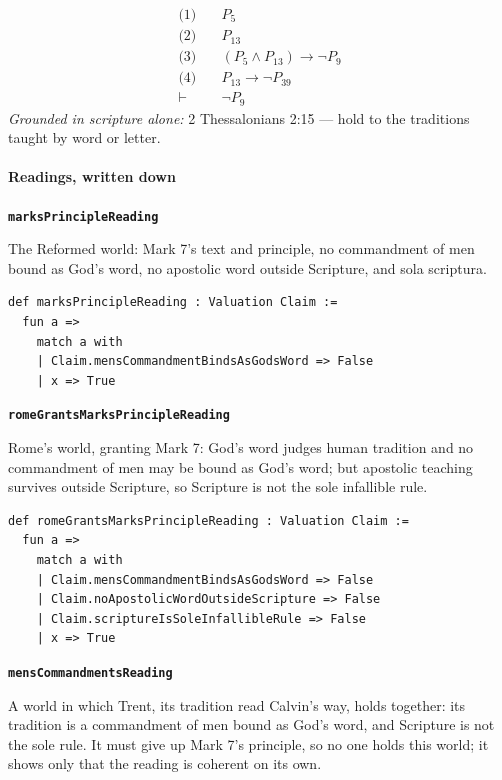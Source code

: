 \documentclass[11pt]{article}
\begin{document}
\begin{align*}
  \text{(1)} \quad & P_{5} \\
  \text{(2)} \quad & P_{13} \\
  \text{(3)} \quad & (P_{5} \land P_{13}) \rightarrow \lnot P_{9} \\
  \text{(4)} \quad & P_{13} \rightarrow \lnot P_{39} \\
  \vdash \quad & \lnot P_{9}
\end{align*}
\emph{Grounded in scripture alone:} 2 Thessalonians 2:15 — hold to the traditions taught by word or letter.
\paragraph*{Readings, written down}
\leavevmode\par
\par\medskip\noindent\textbf{\texttt{marks\allowbreak{}Principle\allowbreak{}Reading}}\par\nobreak\noindent
The Reformed world: Mark 7's text and principle, no commandment of men bound as God's word, no apostolic word outside Scripture, and sola scriptura.

{\small\begin{verbatim}
def marksPrincipleReading : Valuation Claim :=
  fun a =>
    match a with
    | Claim.mensCommandmentBindsAsGodsWord => False
    | x => True
\end{verbatim}}
\par\medskip\noindent\textbf{\texttt{rome\allowbreak{}Grants\allowbreak{}Marks\allowbreak{}Principle\allowbreak{}Reading}}\par\nobreak\noindent
Rome's world, granting Mark 7: God's word judges human tradition and no commandment of men may be bound as God's word; but apostolic teaching survives outside Scripture, so Scripture is not the sole infallible rule.

{\small\begin{verbatim}
def romeGrantsMarksPrincipleReading : Valuation Claim :=
  fun a =>
    match a with
    | Claim.mensCommandmentBindsAsGodsWord => False
    | Claim.noApostolicWordOutsideScripture => False
    | Claim.scriptureIsSoleInfallibleRule => False
    | x => True
\end{verbatim}}
\par\medskip\noindent\textbf{\texttt{mens\allowbreak{}Commandments\allowbreak{}Reading}}\par\nobreak\noindent
A world in which Trent, its tradition read Calvin's way, holds together: its tradition is a commandment of men bound as God's word, and Scripture is not the sole rule. It must give up Mark 7's principle, so no one holds this world; it shows only that the reading is coherent on its own.
\end{document}
